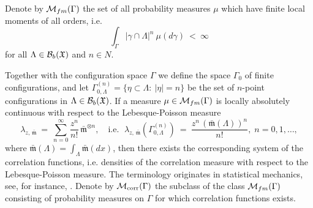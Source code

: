 \documentclass[a4paper,12pt]{article}
\newcommand{\Ga}{\Gamma}
\newcommand{\XXX}{{\mathfrak{X}}}
\begin{document}
Denote by ${\cal M}_{fm}(\Gamma)$ the set of all probability
measures $\mu$ which have finite local moments of all orders, i.e.
$$
\int_{\Gamma} |\gamma \cap \Lambda |^{n} \ \mu (d \gamma) \ < \ \infty
$$
for  all $\Lambda \in {\cal B}_b(\XXX)$ and $n \in N$.

Together with the configuration space $\Gamma$ we define the space  $\Gamma_0$ of finite configurations, and let $\Gamma^{(n)}_{0,\Lambda} = \{\eta \subset \Lambda: \ |\eta| = n  \}$ be the set of $n$-point configurations in $\Lambda \in {\cal B}_b(\XXX)$.
If a measure $ \mu \in {\cal M}_{fm}(\Gamma)$ is locally absolutely continuous with respect  to the Lebesque-Poisson measure
$$
\lambda_{z, \, \bar{\mathfrak{m}}} \ = \ \sum\limits_{n=0}^{\infty} \frac{z^n}{n!} \, {\bar{\mathfrak{m}}}^{\otimes n}, \quad \mbox{i.e. } \;
\lambda_{z, \, \bar{\mathfrak{m}}}(\Gamma^{(n)}_{0,\Lambda}) \ = \ \frac{z^n \,(\bar{\mathfrak{m}}(\Lambda))^n}{n!},
 \; n=0,1, \ldots,
$$
where $\bar{\mathfrak{m}}(\Lambda)= \int_{\Lambda} \bar{\mathfrak{m}}(dx)$, then there exists the corresponding system of the correlation functions, i.e.
densities of the correlation measure with respect to the Lebesque-Poisson measure.
The terminology originates in statistical mechanics, see, for instance, \cite[Ch. 4]{R}.
Denote by ${\cal M}_{\rm{corr}}(\Gamma)$  the subclass of the class ${\cal M}_{fm}(\Gamma)$ consisting of probability measures on $\Ga$ for which correlation functions exists.
\end{document}
